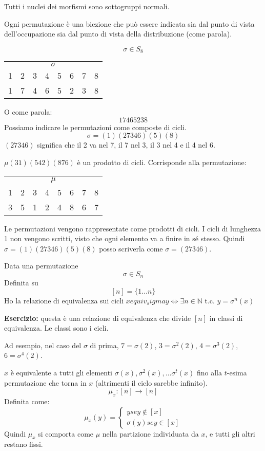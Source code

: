 Tutti i nuclei dei morfismi sono sottogruppi normali.

Ogni permutazione \`e una biezione che pu\`o essere indicata sia dal punto di vista dell'occupazione sia dal punto di vista della distribuzione (come parola).

\[
\sigma \in S_8
\]

\begin{tabular}{*{8}{c}}
\multicolumn{8}{c}{$\sigma$} \\
1 & 2 & 3 & 4 & 5 & 6 & 7 & 8 \\
1 & 7 & 4 & 6 & 5 & 2 & 3 & 8
\end{tabular}

O come parola:
\[
17465238
\]
Possiamo indicare le permutazioni come composte di cicli.
\[
\sigma = (1) (2 7 3 4 6) (5) (8)
\]
$(2 7 3 4 6)$ significa che il 2 va nel 7, il 7 nel 3, il 3 nel 4 e il 4 nel 6.

$\mu (3 1) (5 4 2) (8 7 6)$ \`e un prodotto di cicli. Corrisponde alla permutazione:

\begin{tabular}{*{8}{c}}
\multicolumn{8}{c}{$\mu$} \\
1 & 2 & 3 & 4 & 5 & 6 & 7 & 8 \\
3 & 5 & 1 & 2 & 4 & 8 & 6 & 7
\end{tabular}

Le permutazioni vengono rappresentate come prodotti di cicli. I cicli di lunghezza 1 non vengono scritti, visto che ogni elemento va a finire in s\'e stesso. Quindi $\sigma = (1) (2 7 3 4 6) (5) (8)$ posso scriverla come $\sigma = (2 7 3 4 6)$.

Data una permutazione
\[
\sigma \in S_n 
\]
Definita su
\[
[n] = \{1 \dots n\}
\]
Ho la relazione di equivalenza sui cicli
$x equiv_sigma y \Leftrightarrow \exists n \in \mathbb{N} $ t.c. $ y = \sigma^{n} (x)$

\textbf{Esercizio:} questa \`e una relazione di equivalenza che divide $[n]$ in classi di equivalenza. Le classi sono i cicli.

Ad esempio, nel caso del $\sigma$ di prima, $7 = \sigma(2)$, $3 = \sigma^{2}(2)$, $4 = \sigma^{3} (2)$, $6 = \sigma^{4} (2)$.

$x$ \`e equivalente a tutti gli elementi $\sigma (x), \sigma^{2} (x), \dots \sigma^{t}(x)$ fino alla $t$-esima permutazione che torna in $x$ (altrimenti il ciclo sarebbe infinito).
\[
\mu_x : [n] \to [n]
\]
Definita come:
\[
\mu_x (y) =
\begin{cases}
y se y \notin [x] \\
\sigma(y) se y \in [x]
\end{cases}
\]
Quindi $\mu_x$ si comporta come $\mu$ nella partizione individuata da $x$, e tutti gli altri restano fissi.

